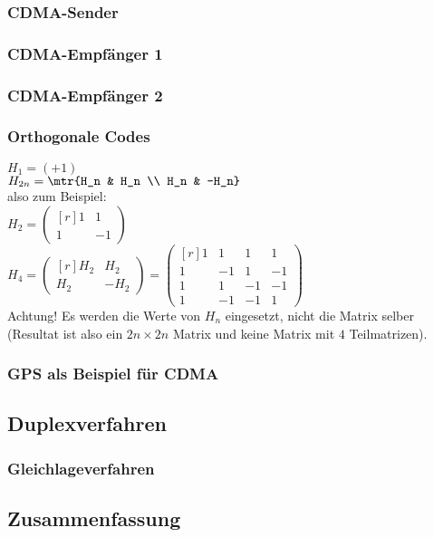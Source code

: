 \subsubsection*{CDMA-Sender}
\subsubsection*{CDMA-Empfänger 1}
\subsubsection*{CDMA-Empfänger 2}

\subsubsection*{Orthogonale Codes}
$H_1=(+1)$\\
$H_{2n}=\mtr{H_n & H_n \\ H_n & -H_n}$\\
also zum Beispiel:\\
$H_2=\begin{pmatrix*}[r]
1 & 1 \\ 1 & -1
\end{pmatrix*}
$\\
$H_4=\begin{pmatrix*}[r]H_2 & H_2 \\ H_2 & -H_2\end{pmatrix*}=\begin{pmatrix*}[r]1 & 1 & 1 & 1\\ 1 & -1 & 1 & -1 \\ 1 & 1 & -1 & -1 \\ 1 & -1 & -1 & 1\end{pmatrix*}$\\
Achtung! Es werden die Werte von $H_n$ eingesetzt, nicht die Matrix selber (Resultat ist also ein $2n \times 2n$ Matrix und keine Matrix mit $4$ Teilmatrizen).

\subsubsection*{GPS als Beispiel für CDMA}

\subsection{Duplexverfahren}
\subsubsection{Gleichlageverfahren}

\subsection{Zusammenfassung}
